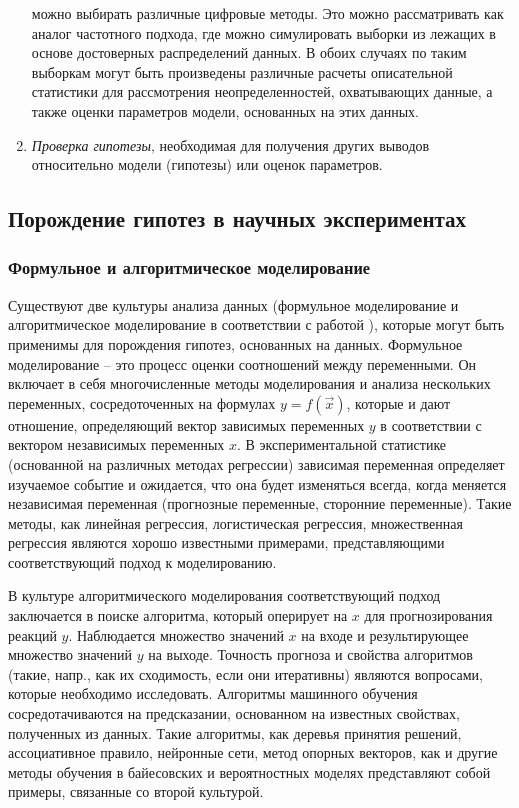 \begin{enumerate}
            можно выбирать различные цифровые методы. Это можно рассматривать как аналог частотного подхода, где можно 
            симулировать выборки из лежащих в основе достоверных распределений данных. В обоих случаях по таким 
            выборкам могут быть произведены различные расчеты описательной статистики для рассмотрения 
            неопределенностей, охватывающих данные, а также оценки параметров модели, основанных на этих данных.
    \item \textit{Проверка гипотезы}, необходимая для получения других выводов относительно 
            модели (гипотезы) или оценок параметров.
\end{enumerate}


\subsection{Порождение гипотез в научных экспериментах}\label{sect1_2_5}
\subsubsection{Формульное и алгоритмическое моделирование}\label{sect1_2_5_1}
Существуют две культуры анализа данных (формульное моделирование  и алгоритмическое моделирование в соответствии с 
работой \cite{breiman2001statistical}), которые могут быть применимы для порождения гипотез, основанных на данных. 
Формульное моделирование – это процесс оценки соотношений между переменными. Он включает в себя многочисленные методы 
моделирования и анализа нескольких переменных, сосредоточенных на формулах $y = f\left(\Vec{x}\right)$, которые и дают 
отношение, определяющий вектор зависимых переменных $y$ в соответствии с вектором независимых переменных $x$. 
В экспериментальной статистике (основанной на различных методах регрессии) зависимая переменная определяет изучаемое 
событие и ожидается, что она будет изменяться всегда, когда меняется независимая переменная (прогнозные переменные, 
сторонние переменные). Такие методы, как линейная регрессия, логистическая регрессия, множественная регрессия являются 
хорошо известными примерами, представляющими соответствующий подход к моделированию.

В культуре алгоритмического моделирования соответствующий подход заключается в поиске алгоритма, который оперирует 
на $x$ для прогнозирования реакций $y$. Наблюдается множество значений $x$ на входе и результирующее множество 
значений $y$ на выходе. Точность прогноза и свойства алгоритмов (такие, напр., как их сходимость, если они итеративны) 
являются вопросами, которые необходимо исследовать. Алгоритмы машинного обучения сосредотачиваются на предсказании, 
основанном на известных свойствах, полученных из данных. Такие алгоритмы, как деревья принятия решений, ассоциативное 
правило, нейронные сети, метод опорных векторов, как и другие методы обучения в байесовских и вероятностных моделях 
\cite{barber2012bayesian, hastie2009elements} представляют собой примеры, связанные со второй культурой. 

